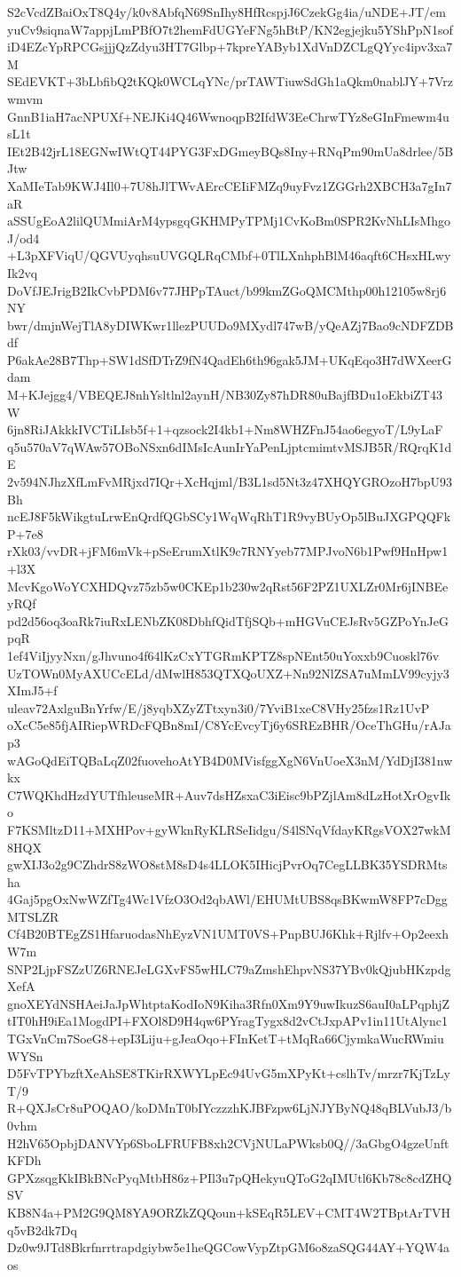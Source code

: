 S2cVcdZBaiOxT8Q4y/k0v8AbfqN69SnIhy8HfRcspjJ6CzekGg4ia/uNDE+JT/em
yuCv9siqnaW7appjLmPBfO7t2hemFdUGYeFNg5hBtP/KN2egjejku5YShPpN1sof
iD4EZcYpRPCGsjjjQzZdyu3HT7Glbp+7kpreYAByb1XdVnDZCLgQYyc4ipv3xa7M
SEdEVKT+3bLbfibQ2tKQk0WCLqYNc/prTAWTiuwSdGh1aQkm0nablJY+7Vrzwmvm
GnnB1iaH7acNPUXf+NEJKi4Q46WwnoqpB2IfdW3EeChrwTYz8eGInFmewm4usL1t
IEt2B42jrL18EGNwIWtQT44PYG3FxDGmeyBQs8Iny+RNqPm90mUa8drlee/5BJtw
XaMIeTab9KWJ4Il0+7U8hJlTWvAErcCEIiFMZq9uyFvz1ZGGrh2XBCH3a7gIn7aR
aSSUgEoA2lilQUMmiArM4ypsgqGKHMPyTPMj1CvKoBm0SPR2KvNhLIsMhgoJ/od4
+L3pXFViqU/QGVUyqhsuUVGQLRqCMbf+0TlLXnhphBlM46aqft6CHsxHLwyIk2vq
DoVfJEJrigB2IkCvbPDM6v77JHPpTAuct/b99kmZGoQMCMthp00h12105w8rj6NY
bwr/dmjnWejTlA8yDIWKwr1llezPUUDo9MXydl747wB/yQeAZj7Bao9cNDFZDBdf
P6akAe28B7Thp+SW1dSfDTrZ9fN4QadEh6th96gak5JM+UKqEqo3H7dWXeerGdam
M+KJejgg4/VBEQEJ8nhYsltlnl2aynH/NB30Zy87hDR80uBajfBDu1oEkbiZT43W
6jn8RiJAkkkIVCTiLIsb5f+1+qzsock2I4kb1+Nm8WHZFnJ54ao6egyoT/L9yLaF
q5u570aV7qWAw57OBoNSxn6dIMsIcAunIrYaPenLjptcmimtvMSJB5R/RQrqK1dE
2v594NJhzXfLmFvMRjxd7IQr+XcHqjml/B3L1sd5Nt3z47XHQYGROzoH7bpU93Bh
ncEJ8F5kWikgtuLrwEnQrdfQGbSCy1WqWqRhT1R9vyBUyOp5lBuJXGPQQFkP+7e8
rXk03/vvDR+jFM6mVk+pSeErumXtlK9c7RNYyeb77MPJvoN6b1Pwf9HnHpw1+l3X
McvKgoWoYCXHDQvz75zb5w0CKEp1b230w2qRst56F2PZ1UXLZr0Mr6jINBEeyRQf
pd2d56oq3oaRk7iuRxLENbZK08DbhfQidTfjSQb+mHGVuCEJsRv5GZPoYnJeGpqR
1ef4ViIjyyNxn/gJhvuno4f64lKzCxYTGRmKPTZ8spNEnt50uYoxxb9Cuoskl76v
UzTOWn0MyAXUCcELd/dMwlH853QTXQoUXZ+Nn92NlZSA7uMmLV99cyjy3XImJ5+f
uleav72AxlguBnYrfw/E/j8yqbXZyZTtxyn3i0/7YviB1xeC8VHy25fzs1Rz1UvP
oXcC5e85fjAIRiepWRDcFQBn8mI/C8YcEvcyTj6y6SREzBHR/OceThGHu/rAJap3
wAGoQdEiTQBaLqZ02fuovehoAtYB4D0MVisfggXgN6VnUoeX3nM/YdDjI381nwkx
C7WQKhdHzdYUTfhleuseMR+Auv7dsHZsxaC3iEisc9bPZjlAm8dLzHotXrOgvIko
F7KSMltzD11+MXHPov+gyWknRyKLRSeIidgu/S4lSNqVfdayKRgsVOX27wkM8HQX
gwXIJ3o2g9CZhdrS8zWO8stM8sD4s4LLOK5IHicjPvrOq7CegLLBK35YSDRMtsha
4Gaj5pgOxNwWZfTg4Wc1VfzO3Od2qbAWl/EHUMtUBS8qsBKwmW8FP7cDggMTSLZR
Cf4B20BTEgZS1HfaruodasNhEyzVN1UMT0VS+PnpBUJ6Khk+Rjlfv+Op2eexhW7m
SNP2LjpFSZzUZ6RNEJeLGXvFS5wHLC79aZmshEhpvNS37YBv0kQjubHKzpdgXefA
gnoXEYdNSHAeiJaJpWhtptaKodIoN9Kiha3Rfn0Xm9Y9uwIkuzS6auI0aLPqphjZ
tIT0hH9iEa1MogdPI+FXOl8D9H4qw6PYragTygx8d2vCtJxpAPv1in11UtAlync1
TGxVnCm7SoeG8+epI3Liju+gJeaOqo+FInKetT+tMqRa66CjymkaWucRWmiuWYSn
D5FvTPYbzftXeAhSE8TKirRXWYLpEc94UvG5mXPyKt+cslhTv/mrzr7KjTzLyT/9
R+QXJsCr8uPOQAO/koDMnT0bIYczzzhKJBFzpw6LjNJYByNQ48qBLVubJ3/b0vhm
H2hV65OpbjDANVYp6SboLFRUFB8xh2CVjNULaPWksb0Q//3aGbgO4gzeUnftKFDh
GPXzsqgKkIBkBNcPyqMtbH86z+PIl3u7pQHekyuQToG2qIMUtl6Kb78c8cdZHQSV
KB8N4a+PM2G9QM8YA9ORZkZQQoun+kSEqR5LEV+CMT4W2TBptArTVHq5vB2dk7Dq
Dz0w9JTd8Bkrfnrrtrapdgiybw5e1heQGCowVypZtpGM6o8zaSQG44AY+YQW4aos

